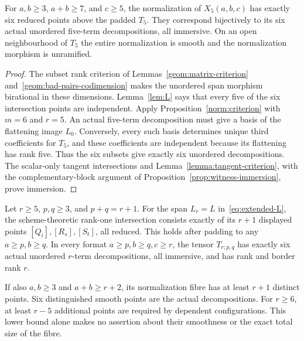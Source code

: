 \begin{corollary}\label{norm:rank-five}
For $a,b\geq3$, $a+b\geq7$, and $c\geq5$, the normalization
of $X_5(a,b,c)$ has exactly six reduced points above the padded
$T_5$. They correspond bijectively to its six actual unordered
five-term decompositions, all immersive. On an open neighbourhood
of $T_5$ the entire normalization is smooth and the normalization
morphism is unramified.
\end{corollary}

\begin{proof}
The subset rank criterion of Lemmas~\ref{geom:matrix-criterion}
and~\ref{geom:bad-pairs-codimension} makes the unordered span
morphism birational in these dimensions. Lemma~\ref{lem:L} says
that every five of the six intersection points are independent.
Apply Proposition~\ref{norm:criterion} with $m=6$ and $r=5$.
An actual five-term decomposition must give a basis of the
flattening image $L_0$. Conversely, every such basis determines
unique third coefficients for $T_5$, and these coefficients are
independent because its flattening has rank five. Thus the six
subsets give exactly six unordered decompositions. The scalar-only
tangent intersections and Lemma~\ref{lemma:tangent-criterion},
with the complementary-block argument of
Proposition~\ref{prop:witness-immersion}, prove immersion.
\end{proof}

\begin{proposition}\label{norm:row-column}
Let $r\geq5$, $p,q\geq3$, and $p+q=r+1$. For the span $L_r=L$
in~\eqref{eq:extended-L}, the scheme-theoretic rank-one intersection
consists exactly of its $r+1$ displayed points $[Q_i],[R_s],[S_t]$,
all reduced. This holds after padding to any $a\geq p,b\geq q$.
In every format $a\geq p,b\geq q,c\geq r$, the tensor
$T_{r;p,q}$ has exactly six actual unordered $r$-term
decompositions, all immersive, and has rank and border rank $r$.

If also $a,b\geq3$ and $a+b\geq r+2$, its normalization fibre
has at least $r+1$ distinct points. Six distinguished smooth points
are the actual decompositions. For $r\geq6$, at least $r-5$
additional points are required by dependent configurations.
This lower bound alone makes no assertion about their smoothness
or the exact total size of the fibre.
\end{proposition}

